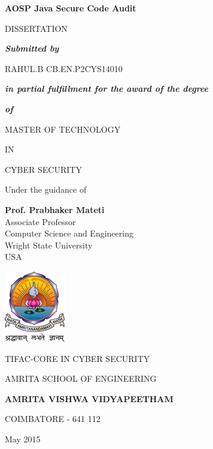  
\begin{center}
  \Large
\textbf{AOSP Java Secure Code Audit}

\vspace*{22pt}
\normalsize
DISSERTATION 

\vspace*{12pt}
\textbf{\textit{Submitted by}}

\vspace*{12pt}
\begin{flushleft}
 \hspace*{115pt}
 \large
RAHUL.B
 \hspace*{2pt}
 \large
CB.EN.P2CYS14010
\end{flushleft}

\vspace*{12pt}
\normalsize
\textit{\textbf{in partial fulfillment for the award of the degree}}

\textbf{\textit{of}}


\vspace*{22pt}
MASTER OF TECHNOLOGY

IN

CYBER SECURITY

\vspace*{22pt}
Under the guidance of

\vspace*{12pt}
\textbf{Prof. Prabhaker Mateti}\\Associate Professor\\Computer Science and Engineering \\ Wright State University\\USA

\vspace*{22pt}
\includegraphics[keepaspectratio=true]{WSU/avvp_logo.png}

\vspace{25pt}
\normalsize
TIFAC-CORE IN CYBER SECURITY

\vspace*{5pt}
AMRITA SCHOOL OF ENGINEERING

\vspace*{5pt}
\large
\textbf{AMRITA VISHWA VIDYAPEETHAM}

\vspace*{5pt}
\normalsize
COIMBATORE - 641 112

\vspace*{5pt}
May 2015
\end{center}
  

